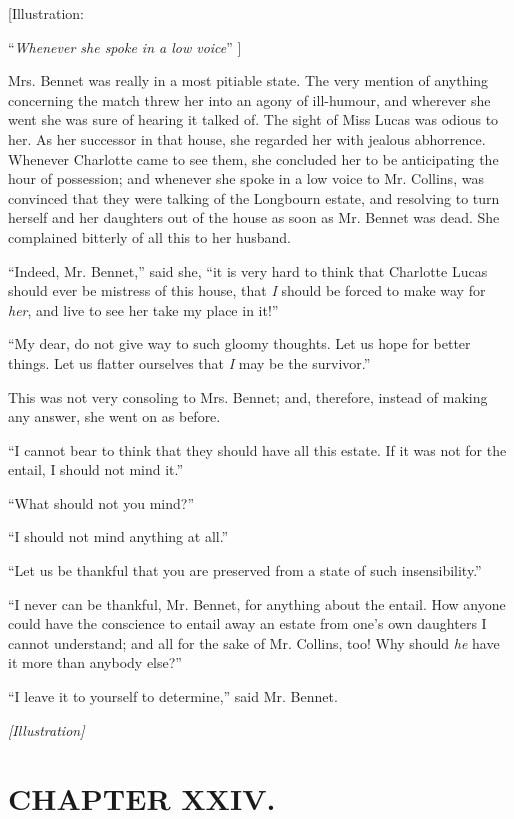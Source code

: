 \documentclass[12pt]{book}
\begin{document}
[Illustration:

``\textit{Whenever she spoke in a low voice}'' ]

Mrs. Bennet was really in a most pitiable state. The very mention of anything concerning the match threw her into an agony of ill-humour, and wherever she went she was sure of hearing it talked of. The sight of Miss Lucas was odious to her. As her successor in that house, she regarded her with jealous abhorrence. Whenever Charlotte came to see them, she concluded her to be anticipating the hour of possession; and whenever she spoke in a low voice to Mr. Collins, was convinced that they were talking of the Longbourn estate, and resolving to turn herself and her daughters out of the house as soon as Mr. Bennet was dead. She complained bitterly of all this to her husband.

``Indeed, Mr. Bennet,'' said she, ``it is very hard to think that Charlotte Lucas should ever be mistress of this house, that \textit{I} should be forced to make way for \textit{her}, and live to see her take my place in it!''

``My dear, do not give way to such gloomy thoughts. Let us hope for better things. Let us flatter ourselves that \textit{I} may be the survivor.''

This was not very consoling to Mrs. Bennet; and, therefore, instead of making any answer, she went on as before.

``I cannot bear to think that they should have all this estate. If it was not for the entail, I should not mind it.''

``What should not you mind?''

``I should not mind anything at all.''

``Let us be thankful that you are preserved from a state of such insensibility.''

``I never can be thankful, Mr. Bennet, for anything about the entail. How anyone could have the conscience to entail away an estate from one's own daughters I cannot understand; and all for the sake of Mr. Collins, too! Why should \textit{he} have it more than anybody else?''

``I leave it to yourself to determine,'' said Mr. Bennet.

\emph{[Illustration]}

\chapter{CHAPTER XXIV.}
\end{document}

